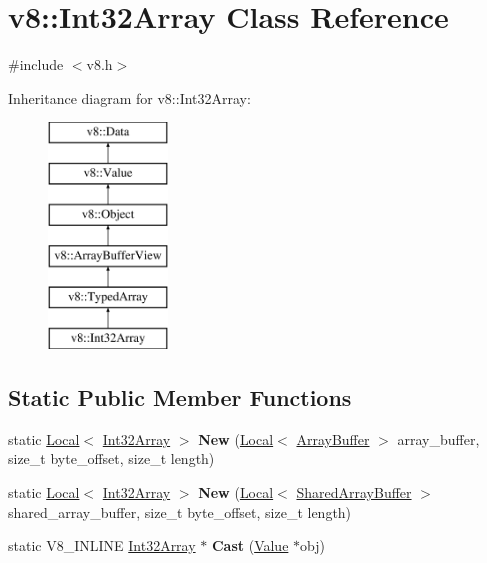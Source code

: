 \hypertarget{classv8_1_1_int32_array}{}\section{v8\+:\+:Int32\+Array Class Reference}
\label{classv8_1_1_int32_array}


{\ttfamily \#include $<$v8.\+h$>$}

Inheritance diagram for v8\+:\+:Int32\+Array\+:\begin{figure}[H]
\begin{center}
\leavevmode
\includegraphics[height=6.000000cm]{classv8_1_1_int32_array}
\end{center}
\end{figure}
\subsection*{Static Public Member Functions}
\begin{DoxyCompactItemize}
\item 
static \hyperlink{classv8_1_1_local}{Local}$<$ \hyperlink{classv8_1_1_int32_array}{Int32\+Array} $>$ {\bfseries New} (\hyperlink{classv8_1_1_local}{Local}$<$ \hyperlink{classv8_1_1_array_buffer}{Array\+Buffer} $>$ array\+\_\+buffer, size\+\_\+t byte\+\_\+offset, size\+\_\+t length)\hypertarget{classv8_1_1_int32_array_a03adbd44725e3325d10bcc448e8bfd75}{}\label{classv8_1_1_int32_array_a03adbd44725e3325d10bcc448e8bfd75}

\item 
static \hyperlink{classv8_1_1_local}{Local}$<$ \hyperlink{classv8_1_1_int32_array}{Int32\+Array} $>$ {\bfseries New} (\hyperlink{classv8_1_1_local}{Local}$<$ \hyperlink{classv8_1_1_shared_array_buffer}{Shared\+Array\+Buffer} $>$ shared\+\_\+array\+\_\+buffer, size\+\_\+t byte\+\_\+offset, size\+\_\+t length)\hypertarget{classv8_1_1_int32_array_acf112fc9df4e0bf2791be73264779905}{}\label{classv8_1_1_int32_array_acf112fc9df4e0bf2791be73264779905}

\item 
static V8\+\_\+\+I\+N\+L\+I\+NE \hyperlink{classv8_1_1_int32_array}{Int32\+Array} $\ast$ {\bfseries Cast} (\hyperlink{classv8_1_1_value}{Value} $\ast$obj)\hypertarget{classv8_1_1_int32_array_afe7cdf534deadc3d872d8a43778809f1}{}\label{classv8_1_1_int32_array_afe7cdf534deadc3d872d8a43778809f1}

\end{DoxyCompactItemize}
